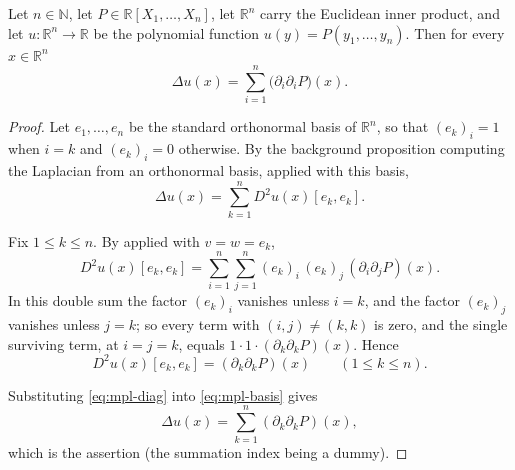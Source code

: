\begin{lemma}
Let $n\in\mathbb{N}$, let $P\in\mathbb{R}[X_1,\dots,X_n]$, let $\mathbb{R}^n$
carry the Euclidean inner product, and let $u:\mathbb{R}^n\to\mathbb{R}$ be the
polynomial function $u(y)=P(y_1,\dots,y_n)$. Then for every $x\in\mathbb{R}^n$
\[
  \Delta u(x)=\sum_{i=1}^{n}\bigl(\partial_i\partial_iP\bigr)(x).
\]
\end{lemma}
\begin{proof}
Let $e_1,\dots,e_n$ be the standard orthonormal basis of $\mathbb{R}^n$, so that
$(e_k)_i=1$ when $i=k$ and $(e_k)_i=0$ otherwise. By the background proposition
computing the Laplacian from an orthonormal basis, applied with this basis,
\begin{equation}\label{eq:mpl-basis}
  \Delta u(x)=\sum_{k=1}^{n}D^2u(x)[e_k,e_k].
\end{equation}

Fix $1\le k\le n$. By  applied with $v=w=e_k$,
\[
  D^2u(x)[e_k,e_k]
  =\sum_{i=1}^{n}\sum_{j=1}^{n}(e_k)_i\,(e_k)_j\,(\partial_i\partial_jP)(x).
\]
In this double sum the factor $(e_k)_i$ vanishes unless $i=k$, and the factor
$(e_k)_j$ vanishes unless $j=k$; so every term with $(i,j)\ne(k,k)$ is zero, and
the single surviving term, at $i=j=k$, equals
$1\cdot1\cdot(\partial_k\partial_kP)(x)$. Hence
\begin{equation}\label{eq:mpl-diag}
  D^2u(x)[e_k,e_k]=(\partial_k\partial_kP)(x)
  \qquad(1\le k\le n).
\end{equation}

Substituting \eqref{eq:mpl-diag} into \eqref{eq:mpl-basis} gives
\[
  \Delta u(x)=\sum_{k=1}^{n}(\partial_k\partial_kP)(x),
\]
which is the assertion (the summation index being a dummy).
\end{proof}
